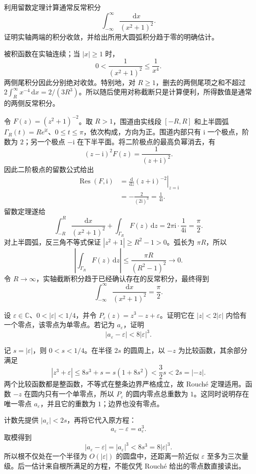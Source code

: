 \begin{exercise}\label{b3:ex:03-4}
利用留数定理计算通常反常积分
\[
  \int_{-\infty}^{\infty}\frac{\mathrm{d}x}{(x^2+1)^2}.
\]
证明实轴两端的积分收敛，并给出所用大圆弧积分趋于零的明确估计。
\end{exercise}
\begin{solution}
被积函数在实轴连续；当 \(|x|\ge1\) 时，
\[
  0<\frac1{(x^2+1)^2}\le\frac1{x^4}.
\]
两侧尾积分因此分别绝对收敛。特别地，对 \(R\ge1\)，删去的两侧尾项之和不超过
\(2\int_R^\infty x^{-4}\,\mathrm{d}x=2/(3R^3)\)。所以随后使用对称截断只是计算便利，所得数值是通常的两侧反常积分。

令 \(F(z)=(z^2+1)^{-2}\)。取 \(R>1\)，围道由实线段 \([-R,R]\) 和上半圆弧
\(\Gamma_R(t)=Re^{\mathrm{i}t}\)、\(0\le t\le\pi\)，依次构成，方向为正。围道内部只有 \(\mathrm{i}\) 一个极点，阶数为 \(2\)；另一个极点 \(-\mathrm{i}\) 在下半平面。将二阶极点的最高负幂消去，有
\[
  (z-\mathrm{i})^2F(z)=\frac1{(z+\mathrm{i})^2}.
\]
因此二阶极点的留数公式给出
\[
\begin{aligned}
  \operatorname{Res}(F,\mathrm{i})
  &=\left.\frac{\mathrm{d}}{\mathrm{d}z}
                   (z+\mathrm{i})^{-2}\right|_{z=\mathrm{i}}\\
  &=-\frac2{(2\mathrm{i})^3}
   =\frac1{4\mathrm{i}}.
\end{aligned}
\]
留数定理遂给
\[
  \int_{-R}^{R}\frac{\mathrm{d}x}{(x^2+1)^2}
  +\int_{\Gamma_R}F(z)\,\mathrm{d}z
  =2\pi\mathrm{i}\cdot\frac1{4\mathrm{i}}=\frac\pi2.
\]
对上半圆弧，反三角不等式保证
\(|z^2+1|\ge R^2-1>0\)。弧长为 \(\pi R\)，所以
\[
  \left|\int_{\Gamma_R}F(z)\,\mathrm{d}z\right|
  \le\frac{\pi R}{(R^2-1)^2}\longrightarrow0.
\]
令 \(R\to\infty\)，实轴截断积分趋于已经确认存在的反常积分，最终得到
\[
  \int_{-\infty}^{\infty}\frac{\mathrm{d}x}{(x^2+1)^2}
  =\frac\pi2.
\]
\end{solution}

\begin{exercise}\label{b3:ex:03-5}
设 \(\varepsilon\in\mathbb C\)、\(0<|\varepsilon|<1/4\)，并令
\(P_\varepsilon(z)=z^3-z+\varepsilon\)。证明它在
\(|z|<2|\varepsilon|\) 内恰有一个零点，该零点为单零点。若记为 \(a_\varepsilon\)，证明
\[
  |a_\varepsilon-\varepsilon|<8|\varepsilon|^3.
\]
\end{exercise}
\begin{solution}
记 \(s=|\varepsilon|\)，则 \(0<s<1/4\)。在半径 \(2s\) 的圆周上，以 \(-z\) 为比较函数，其余部分满足
\[
  |z^3+\varepsilon|\le8s^3+s
  =s(1+8s^2)<\frac32s<2s=|-z|.
\]
两个比较函数都是整函数，不等式在整条边界严格成立，故 Rouché 定理适用。函数 \(-z\) 在圆内只有一个单零点，所以 \(P_\varepsilon\) 的圆内零点总重数为 \(1\)。这同时说明存在唯一零点 \(a_\varepsilon\)，并且它的重数为 \(1\)；边界也没有零点。

计数先提供 \(|a_\varepsilon|<2s\)，再将它代入原方程：
\[
  a_\varepsilon-\varepsilon=a_\varepsilon^3.
\]
取模得到
\[
  |a_\varepsilon-\varepsilon|
  =|a_\varepsilon|^3<8s^3=8|\varepsilon|^3.
\]
所以根不仅处在一个半径为 \(O(|\varepsilon|)\) 的圆盘中，还距离一阶近似 \(\varepsilon\) 至多为三次量级。后一估计来自根所满足的方程，不能仅凭 Rouché 给出的零点数直接读出。
\end{solution}

